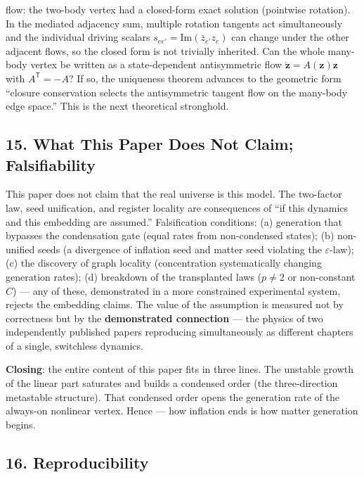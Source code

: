\documentclass[
  a4paper,
]{article}
\begin{document}
\begin{enumerate}
{  flow}: the two-body vertex had a closed-form exact solution (pointwise
  rotation). In the mediated adjacency sum, multiple rotation tangents
  act simultaneously and the individual driving scalars
  \(s_{ee'}=\mathrm{Im}(\bar z_{e'}z_e)\) can change under the other
  adjacent flows, so the closed form is not trivially inherited. Can the
  whole many-body vertex be written as a state-dependent antisymmetric
  flow \(\dot{\mathbf z}=A(\mathbf z)\mathbf z\) with
  \(A^{\mathsf T}=-A\)? If so, the uniqueness theorem advances to the
  geometric form ``closure conservation selects the antisymmetric
  tangent flow on the many-body edge space.'' This is the next
  theoretical stronghold.
\end{enumerate}

\subsection{15. What This Paper Does Not Claim;
Falsifiability}\label{what-this-paper-does-not-claim-falsifiability}

This paper does not claim that the real universe is this model. The
two-factor law, seed unification, and register locality are consequences
of ``if this dynamics and this embedding are assumed.'' Falsification
conditions: (a) generation that bypasses the condensation gate (equal
rates from non-condensed states); (b) non-unified seeds (a divergence of
inflation seed and matter seed violating the \(\varepsilon\)-law); (c)
the discovery of graph locality (concentration systematically changing
generation rates); (d) breakdown of the transplanted laws (\(p\neq2\) or
non-constant \(C\)) --- any of these, demonstrated in a more constrained
experimental system, rejects the embedding claims. The value of the
assumption is measured not by correctness but by the
\textbf{demonstrated connection} --- the physics of two independently
published papers reproducing simultaneously as different chapters of a
single, switchless dynamics.

\textbf{Closing}: the entire content of this paper fits in three lines.
The unstable growth of the linear part saturates and builds a condensed
order (the three-direction metastable structure). That condensed order
opens the generation rate of the always-on nonlinear vertex. Hence ---
how inflation ends is how matter generation begins.

\subsection{16. Reproducibility}\label{reproducibility}
\end{document}
